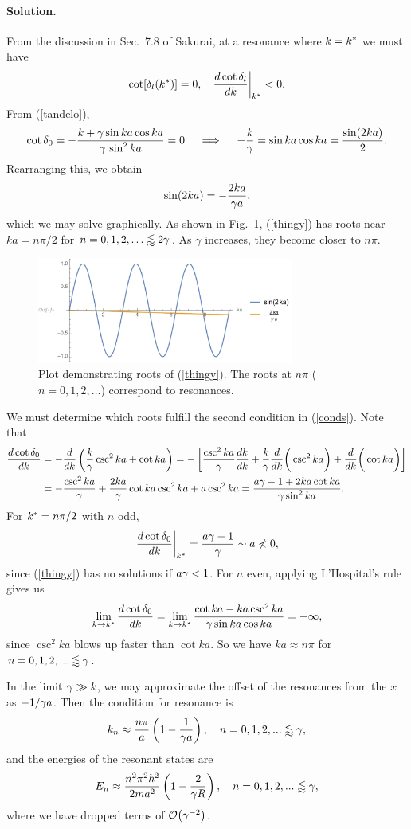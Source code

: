 \documentclass[11pt]{article}
\newcommand{\refeq}[1]{(\ref{#1})}
\newcommand{\beq}{\begin{equation*}}
\newcommand{\eeq}{\end{equation*}}
\newcommand{\beqn}{\begin{equation}}
\newcommand{\eeqn}{\end{equation}}
\newenvironment{solution}
{
	\paragraph{Solution.}
}
{
	\bigskip
}
\newcommand{\qimplies}{\quad \implies \quad}
\begin{document}
\begin{solution}
	From the discussion in Sec.~7.8 of Sakurai, at a resonance where $k = k^*$ we must have
	\begin{align} \label{conds}
		\cot[\delta_l(k^*)] &= 0, &
		\left. \dv{\cot\delta_l}{k} \right|_{k^*} < 0.
	\end{align}
	From \refeq{tandelo},
	\beq
		\cot\delo = -\frac{k + \gam \sin ka \cos ka}{\gam \, \sin^2 ka} = 0
		\qimplies
		-\frac{k}{\gam} = \sin ka \cos ka = \frac{\sin(2ka)}{2}.
	\eeq
	Rearranging this, we obtain
	\beqn \label{thingy}
		\sin(2ka) = -\frac{2ka}{\gam a},
	\eeqn
	which we may solve graphically.  As shown in Fig.~\ref{plot3}, \refeq{thingy} has roots near $ka = n \pi / 2$ for $n = 0, 1, 2, \ldots \lessapprox 2\gamma$.  As $\gamma$ increases, they become closer to $n\pi$.
	
	\begin{figure} \centering
		\includegraphics[width=0.75\textwidth]{plot3}
		\caption{Plot demonstrating roots of \refeq{thingy}.  The roots at $n \pi$ ($n = 0, 1, 2, \ldots$) correspond to resonances.}
		\label{plot3}
	\end{figure}
	
	We must determine which roots fulfill the second condition in \refeq{conds}.  Note that
	\begin{align}
		\dv{\cot\delta_0}{k} &= -\dv{k} \left( \frac{k}{\gamma} \csc^2 ka + \cot ka \right)
		= -\left[ \frac{\csc^2 ka}{\gamma} \dv{k}{k} + \frac{k}{\gamma} \dv{k} \bigg( \csc^2 ka \bigg) + \dv{k} \bigg( \cot ka \bigg) \right] \notag \\
		&=  -\frac{\csc^2 ka}{\gamma} + \frac{2 ka}{\gamma} \cot ka \csc^2 ka + a \csc^2 ka
		= \frac{a\gamma - 1 + 2 ka \cot ka}{\gamma \sin^2 ka}. \label{delder}
	\end{align}
	For $k^* = n\pi/2$ with $n$ odd,
	\beq
		\left. \dv{\cot\delo}{k} \right|_{\ks} = \frac{a \gam - 1}{\gam} \sim a \not< 0,
	\eeq
	since \refeq{thingy} has no solutions if $a \gamma < 1$.  For $n$ even, applying L'Hospital's rule gives us
	\beq
		\lim_{k \to \ks} \dv{\cot\delo}{k} = \lim_{k \to \ks} \frac{\cot ka - ka \csc^2 ka}{\gam \sin ka \cos ka} = -\infty,
	\eeq
	since $\csc^2 ka$ blows up faster than $\cot ka$.  So we have $ka \approx n\pi$ for $n = 0, 1, 2, ... \lessapprox \gamma$.
	
	In the limit $\gamma \gg k$, we may approximate the offset of the resonances from the $x$ as $-1 / \gamma a$.  Then the condition for resonance is
	\beq
		\kn \approx \frac{n \pi}{a} \left( 1 - \frac{1}{\gam a} \right), \quad n = 0, 1, 2, ... \lessapprox \gam,
	\eeq
	and the energies of the resonant states are
	\beq
		\En \approx \frac{n^2 \pi^2 \hbar^2}{2 m a^2} \left( 1 - \frac{2}{\gam R} \right), \quad n = 0, 1, 2, ... \lessapprox \gam,
	\eeq
	where we have dropped terms of $\order{\gam^{-2}}$.
\end{solution}
\end{document}
